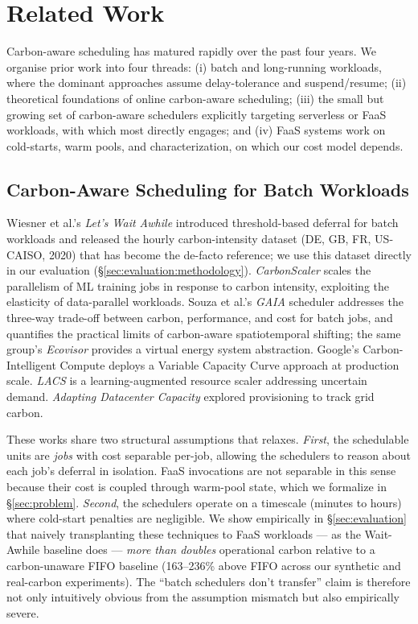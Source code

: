 \section{Related Work}
\label{sec:related}

Carbon-aware scheduling has matured rapidly over the past four years.
We organise prior work into four threads: (i) batch and long-running
workloads, where the dominant approaches assume delay-tolerance and
suspend/resume; (ii) theoretical foundations of online carbon-aware
scheduling; (iii) the small but growing set of carbon-aware
schedulers explicitly targeting serverless or FaaS workloads, with
which \GreenFaaS{} most directly engages; and (iv) FaaS systems work
on cold-starts, warm pools, and characterization, on which our cost
model depends.

\subsection{Carbon-Aware Scheduling for Batch Workloads}

Wiesner et al.'s \emph{Let's Wait Awhile} \citep{wiesner2021lets}
introduced threshold-based deferral for batch workloads and released
the hourly carbon-intensity dataset (DE, GB, FR, US-CAISO, 2020) that
has become the de-facto reference; we use this dataset directly in
our evaluation (\S\ref{sec:evaluation:methodology}).
\emph{CarbonScaler} \citep{hanafy2023carbonscaler} scales the
parallelism of ML training jobs in response to carbon intensity,
exploiting the elasticity of data-parallel workloads.
Souza et al.'s \emph{GAIA} scheduler
\citep{sukprasert2023quantifying} addresses the three-way trade-off
between carbon, performance, and cost for batch jobs, and quantifies
the practical limits of carbon-aware spatiotemporal shifting; the same
group's \emph{Ecovisor} \citep{souza2023ecovisor} provides a virtual
energy system abstraction. Google's Carbon-Intelligent Compute
\citep{radovanovic2023google} deploys a Variable Capacity Curve
approach at production scale.
\emph{LACS} \citep{bostandoost2024lacs} is a learning-augmented
resource scaler addressing uncertain demand.
\emph{Adapting Datacenter Capacity} \citep{lin2023adapting} explored
provisioning to track grid carbon.

These works share two structural assumptions that \GreenFaaS{}
relaxes. \emph{First}, the schedulable units are \emph{jobs} with
cost separable per-job, allowing the schedulers to reason about each
job's deferral in isolation. FaaS invocations are not separable in
this sense because their cost is coupled through warm-pool state,
which we formalize in \S\ref{sec:problem}. \emph{Second}, the
schedulers operate on a timescale (minutes to hours) where cold-start
penalties are negligible. We show empirically in
\S\ref{sec:evaluation} that naively transplanting these techniques to
FaaS workloads --- as the Wait-Awhile baseline does ---
\emph{more than doubles} operational carbon relative to a
carbon-unaware FIFO baseline (163--236\% above FIFO across our
synthetic and real-carbon experiments). The ``batch schedulers don't
transfer'' claim is therefore not only intuitively obvious from the
assumption mismatch but also empirically severe.

